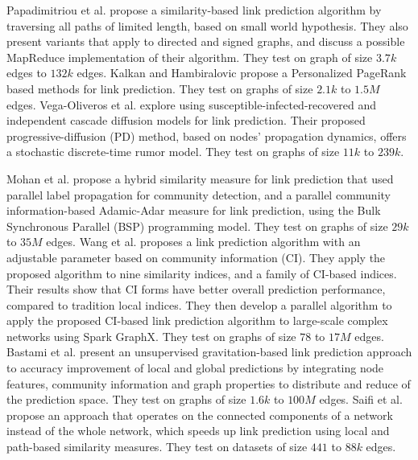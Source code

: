 Papadimitriou et al. \cite{papadimitriou2012fast} propose a similarity-based link prediction algorithm by traversing all paths of limited length, based on small world hypothesis. They also present variants that apply to directed and signed graphs, and discuss a possible MapReduce implementation of their algorithm. They test on graph of size $3.7k$ edges to $132k$ edges.
Kalkan and Hambiralovic \cite{kalkanfinding} propose a Personalized PageRank based methods for link prediction. They test on graphs of size $2.1k$ to $1.5M$ edges.
Vega-Oliveros et al. \cite{vega2021link} explore using susceptible-infected-recovered and independent cascade diffusion models for link prediction. Their proposed progressive-diffusion (PD) method, based on nodes' propagation dynamics, offers a stochastic discrete-time rumor model. They test on graphs of size $11k$ to $239k$.

Mohan et al. \cite{mohan2017scalable} propose a hybrid similarity measure for link prediction that used parallel label propagation for community detection, and a parallel community information-based Adamic-Adar measure for link prediction, using the Bulk Synchronous Parallel (BSP) programming model. They test on graphs of size $29k$ to $35M$ edges.
Wang et al. \cite{wang2019link} proposes a link prediction algorithm with an adjustable parameter based on community information (CI). They apply the proposed algorithm to nine similarity indices, and a family of CI-based indices. Their results show that CI forms have better overall prediction performance, compared to tradition local indices. They then develop a parallel algorithm to apply the proposed CI-based link prediction algorithm to large-scale complex networks using Spark GraphX. They test on graphs of size $78$ to $17M$ edges.
Bastami et al. \cite{bastami2019gravitation} present an unsupervised gravitation-based link prediction approach to accuracy improvement of local and global predictions by integrating node features, community information and graph properties to distribute and reduce of the prediction space. They test on graphs of size $1.6k$ to $100M$ edges.
Saifi et al. \cite{saifi2023fast} propose an approach that operates on the connected components of a network instead of the whole network, which speeds up link prediction using local and path-based similarity measures. They test on datasets of size $441$ to $88k$ edges.

